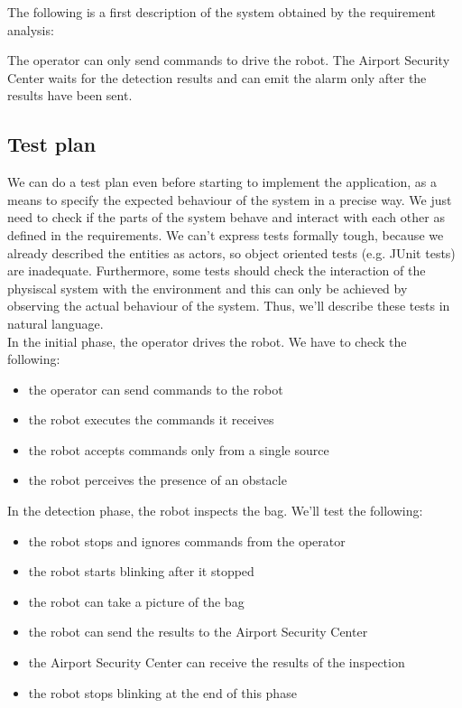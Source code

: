 \documentclass{llncs}
\begin{document}
The following is a first description of the system obtained by the requirement analysis:

The operator can only send commands to drive the robot.
The Airport Security Center waits for the detection results and can emit the alarm only after the results have been sent.

\subsection{Test plan}
We can do a test plan even before starting to implement the application, as a means to specify the expected behaviour of the system in a precise way. We just need to check if the parts of the system behave and interact with each other as defined in the requirements.
We can't express tests formally tough, because we already described the entities as actors, so object oriented tests (e.g. JUnit tests) are inadequate. Furthermore, some tests should check the interaction of the physiscal system with the environment and this can only be achieved by observing the actual behaviour of the system. Thus, we'll describe these tests in natural language.\\
In the initial phase, the operator drives the robot. We have to check the following:
\begin{itemize}
\item the operator can send commands to the robot
\item the robot executes the commands it receives
\item the robot accepts commands only from a single source
\item the robot perceives the presence of an obstacle
\end{itemize}
In the detection phase, the robot inspects the bag. We'll test the following:
\begin{itemize}
\item the robot stops and ignores commands from the operator
\item the robot starts blinking after it stopped
\item the robot can take a picture of the bag
\item the robot can send the results to the Airport Security Center
\item the Airport Security Center can receive the results of the inspection
\item the robot stops blinking at the end of this phase
\end{itemize}
\end{document}
